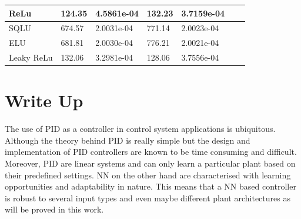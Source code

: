 \documentclass{article}
\begin{document}
\begin{table}
\begin{tabular}{|l|l|l|l|l|l|l|}
ReLu                                                         & 124.35 & 4.5861e-04                                           & 132.23 & 3.7159e-04                                           &       &                                                      \\ \hline
SQLU                                                         & 674.57 & 2.0031e-04                                           & 771.14 & 2.0023e-04                                           &       &                                                      \\ \hline
ELU                                                          & 681.81 & 2.0030e-04                                           & 776.21 & 2.0021e-04                                           &       &                                                      \\ \hline
Leaky ReLu                                                   & 132.06 & 3.2981e-04                                           & 128.06 & 3.7556e-04                                           &       &                                                      \\ \hline
\end{tabular}
\end{table}


\section{Write Up}
The use of PID as a controller in control system applications is ubiquitous. Although the theory behind PID is really simple but the design and implementation of PID controllers are known to be time consuming and difficult. Moreover, PID are linear systems and can only learn a particular plant based on their predefined settings. NN on the other hand are characterised with learning opportunities and adaptability in nature. This means that a NN based controller is robust to several input types and even maybe different plant architectures as will be proved in this work.
\end{document}
